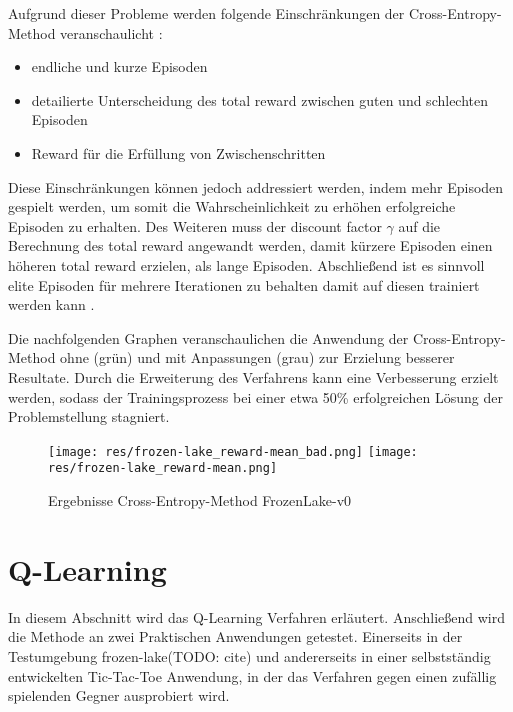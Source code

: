 \documentclass[11pt]{scrartcl}
\begin{document}
Aufgrund dieser Probleme werden folgende Einschränkungen der Cross-Entropy-Method veranschaulicht
\cite[~S.92 f.]{L2018}:
\begin{itemize}
\itemsep0pt
\item endliche und kurze Episoden
\item detailierte Unterscheidung des total reward zwischen guten und schlechten Episoden
\item Reward für die Erfüllung von Zwischenschritten
\end{itemize}

Diese Einschränkungen können jedoch addressiert werden, indem mehr Episoden gespielt werden, um somit
die Wahrscheinlichkeit zu erhöhen erfolgreiche Episoden zu erhalten. Des Weiteren muss der discount
factor $\gamma$ auf die Berechnung des total reward angewandt werden, damit kürzere Episoden einen
höheren total reward erzielen, als lange Episoden. Abschließend ist es sinnvoll elite Episoden für
mehrere Iterationen zu behalten damit auf diesen trainiert werden kann \cite[~S.93]{L2018}.  

Die nachfolgenden Graphen veranschaulichen die Anwendung der Cross-Entropy-Method ohne (grün) und mit
Anpassungen (grau) zur Erzielung besserer Resultate. Durch die Erweiterung des Verfahrens kann eine
Verbesserung erzielt werden, sodass der Trainingsprozess bei einer etwa 50\% erfolgreichen Lösung der
Problemstellung stagniert.

\begin{figure}[htp]
\centering
\texttt{[image: res/frozen-lake\_reward-mean\_bad.png]}
\texttt{[image: res/frozen-lake\_reward-mean.png]}
\caption{Ergebnisse Cross-Entropy-Method FrozenLake-v0}
\label{fig:frozen-lake_cross-entropy}
\end{figure}


\newpage
\section{Q-Learning}
In diesem Abschnitt wird das Q-Learning Verfahren erläutert. Anschließend wird die Methode
an zwei Praktischen Anwendungen getestet. Einerseits in der Testumgebung \grqq
frozen-lake\grqq (TODO: cite) und andererseits in einer selbstständig entwickelten
Tic-Tac-Toe Anwendung, in der das Verfahren gegen einen zufällig spielenden Gegner
ausprobiert wird.
\end{document}
